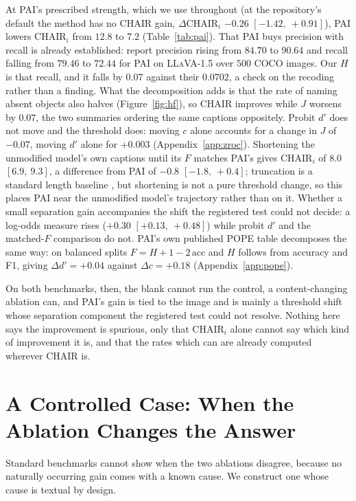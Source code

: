 \documentclass{article} %
\newcommand{\civ}[2]{$[#1,\ #2]$}
\begin{document}
At PAI's prescribed strength, which we use throughout (at the
repository's default the method has no CHAIR gain, $\Delta\mathrm{CHAIR}_i$ $-0.26$
\civ{-1.42}{+0.91}), PAI lowers $\mathrm{CHAIR}_i$ from $12.8$ to $7.2$ (Table~\ref{tab:pai}). That PAI buys precision with
recall is already established: \citet{sparc} report precision rising from $84.70$ to $90.64$ and recall
falling from $79.46$ to $72.44$ for PAI on \textsc{LLaVA-1.5} over $500$ COCO images. Our $H$ is that
recall, and it falls by $0.07$ against their $0.0702$, a check on the recoding rather than a finding.
What the decomposition adds is that the rate of naming absent objects also halves (Figure~\ref{fig:hf}), so CHAIR improves
while $J$ worsens by $0.07$, the two summaries ordering the same captions oppositely. Probit $d'$ does
not move and the threshold does: moving $c$ alone accounts for a change in $J$ of $-0.07$, moving $d'$
alone for $+0.003$ (Appendix~\ref{app:zroc}). Shortening the unmodified model's own captions until
its $F$ matches PAI's gives $\mathrm{CHAIR}_i$ of $8.0$ \civ{6.9}{9.3}, a difference from PAI of $-0.8$
\civ{-1.8}{+0.4}; truncation is a standard length baseline \citep{lessismore}, but shortening is not a
pure threshold change, so this places PAI near the unmodified model's trajectory rather than on it.
Whether a small separation gain accompanies the shift the registered test could not decide: a log-odds
measure rises ($+0.30$ \civ{+0.13}{+0.48}) while probit $d'$ and the matched-$F$ comparison do not. PAI's own published POPE table decomposes the same way: on balanced splits
$F = H + 1 - 2\,\mathrm{acc}$ and $H$ follows from accuracy and F1, giving $\Delta d' = +0.04$ against
$\Delta c = +0.18$ (Appendix~\ref{app:pope}).

On both benchmarks, then, the blank cannot run the control, a content-changing ablation can, and PAI's
gain is tied to the image and is mainly a threshold shift whose separation component the registered
test could not resolve. Nothing here says the improvement is spurious, only that $\mathrm{CHAIR}_i$
alone cannot say which kind of improvement it is, and that the rates which can are already computed
wherever CHAIR is.

\section{A Controlled Case: When the Ablation Changes the Answer}
\label{sec:results}

Standard benchmarks cannot show when the two ablations disagree, because no naturally occurring gain
comes with a known cause. We construct one whose cause is textual by design.
\end{document}
